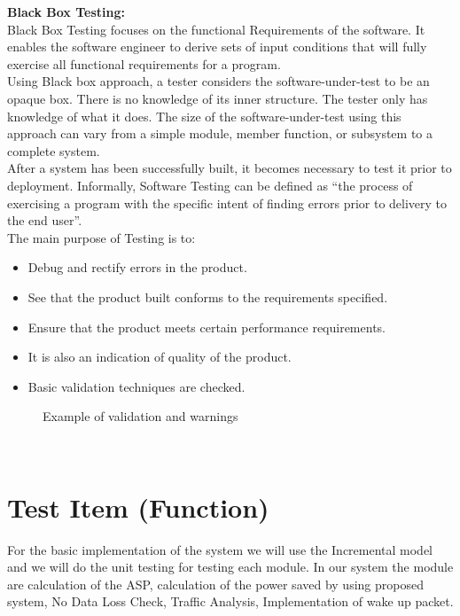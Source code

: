 \documentclass{SureshLimkar}
\begin{document}
\textbf{Black Box Testing:}\\
\hspace{0.5 in}Black Box Testing focuses on the functional Requirements of the software. It enables the software engineer to derive sets of input conditions that will fully exercise all functional requirements for a program.\\
Using Black box approach, a tester considers the software-under-test to be an opaque box. There is no knowledge of its inner structure. The tester only has knowledge of what it does. The size of the software-under-test using this approach can vary from a simple module, member function, or subsystem to a complete system. \\
\hspace{0.5 in}After a system has been successfully built, it becomes necessary to test it prior to deployment. Informally, Software Testing can be defined as “the process of exercising a program with the specific intent of finding errors prior to delivery to the end user”.\\
The main purpose of Testing is to:
\begin{itemize}
	\item Debug and rectify errors in the product.
	\item See that the product built conforms to the requirements specified.
	\item Ensure that the product meets certain performance requirements.
	\item It is also an indication of quality of the product.
	\item Basic validation techniques are checked.
\end{itemize}

\begin{figure}[h]%
\centering
{}%
\caption{Example of validation and warnings}%
\label{Error}%
\end{figure}
\\
\section{Test Item (Function)}
For the basic implementation of the system we will use the Incremental model and we will do the unit testing for testing each module. In our system the module are calculation of the ASP, calculation of the power saved by using proposed system, No Data Loss Check, Traffic Analysis, Implementation of wake up packet.
\end{document}
